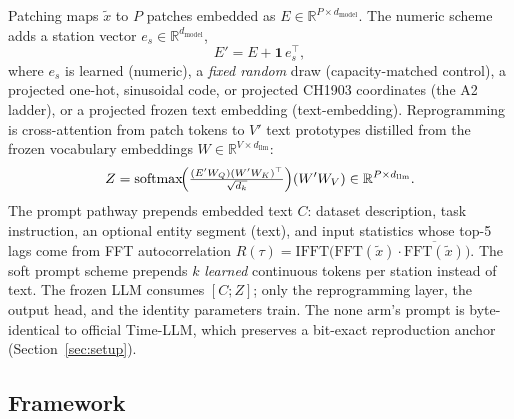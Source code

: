 \documentclass[sigconf,review]{acmart}
\begin{document}
Patching maps $\tilde{x}$ to $P$ patches embedded as
$E\in\mathbb{R}^{P\times d_{\mathrm{model}}}$. The \textsf{numeric} scheme adds a
station vector $e_s\in\mathbb{R}^{d_{\mathrm{model}}}$,
\begin{equation}
E' = E + \mathbf{1}\,e_s^{\top},
\label{eq:additive}
\end{equation}
where $e_s$ is learned (\textsf{numeric}), a \emph{fixed random} draw
(capacity-matched control), a projected one-hot, sinusoidal code, or projected
CH1903 coordinates (the A2 ladder), or a projected frozen text embedding
(\textsf{text-embedding}). Reprogramming is cross-attention from patch tokens to
$V'$ text prototypes distilled from the frozen vocabulary embeddings
$W\in\mathbb{R}^{V\times d_{\mathrm{llm}}}$:
\begin{equation}
Z=\mathrm{softmax}\!\Bigl(\tfrac{(E'W_Q)(W'W_K)^{\top}}{\sqrt{d_k}}\Bigr)(W'W_V)
\in\mathbb{R}^{P\times d_{\mathrm{llm}}}.
\label{eq:reprog}
\end{equation}
The prompt pathway prepends embedded text $C$: dataset description, task
instruction, an optional entity segment (\textsf{text}), and input statistics whose
top-5 lags come from FFT autocorrelation
$R(\tau)=\mathrm{IFFT}\bigl(\mathrm{FFT}(\tilde{x})\cdot
\overline{\mathrm{FFT}(\tilde{x})}\bigr)$. The \textsf{soft prompt} scheme prepends
$k$ \emph{learned} continuous tokens per station instead of text. The frozen LLM
consumes $[C;Z]$; only the reprogramming layer, the output head, and the identity
parameters train. The \textsf{none} arm's prompt is byte-identical to official
Time-LLM, which preserves a bit-exact reproduction anchor (Section~\ref{sec:setup}).

\subsection{Framework}
\end{document}
